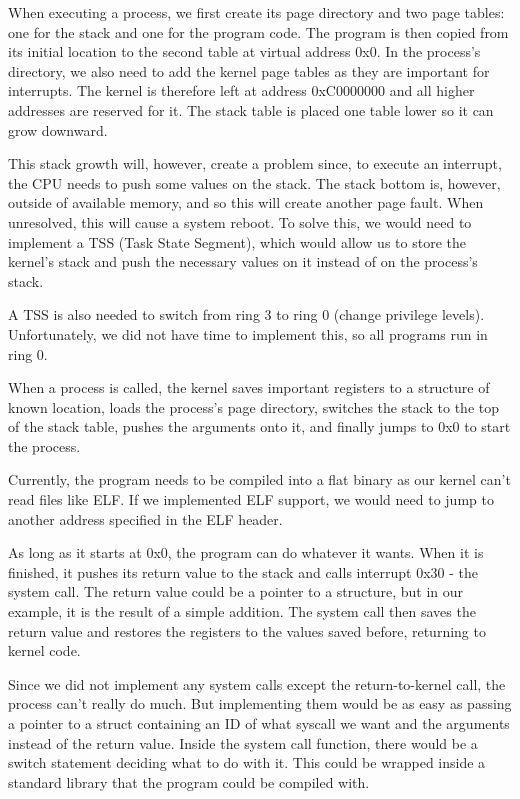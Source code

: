\documentclass{article}
\begin{document}
When executing a process, we first create its page directory and two page tables: one for the stack and one for the program code. The program is then copied from its initial location to the second table at virtual address 0x0. In the process's directory, we also need to add the kernel page tables as they are important for interrupts. The kernel is therefore left at address 0xC0000000 and all higher addresses are reserved for it. The stack table is placed one table lower so it can grow downward. 

This stack growth will, however, create a problem since, to execute an interrupt, the CPU needs to push some values on the stack. The stack bottom is, however, outside of available memory, and so this will create another page fault. When unresolved, this will cause a system reboot. To solve this, we would need to implement a TSS (Task State Segment), which would allow us to store the kernel's stack and push the necessary values on it instead of on the process's stack. 

A TSS is also needed to switch from ring 3 to ring 0 (change privilege levels). Unfortunately, we did not have time to implement this, so all programs run in ring 0.

When a process is called, the kernel saves important registers to a structure of known location, loads the process's page directory, switches the stack to the top of the stack table, pushes the arguments onto it, and finally jumps to 0x0 to start the process. 

Currently, the program needs to be compiled into a flat binary as our kernel can't read files like ELF. If we implemented ELF support, we would need to jump to another address specified in the ELF header.

As long as it starts at 0x0, the program can do whatever it wants. When it is finished, it pushes its return value to the stack and calls interrupt 0x30 - the system call. The return value could be a pointer to a structure, but in our example, it is the result of a simple addition. The system call then saves the return value and restores the registers to the values saved before, returning to kernel code. 

Since we did not implement any system calls except the return-to-kernel call, the process can't really do much. But implementing them would be as easy as passing a pointer to a struct containing an ID of what syscall we want and the arguments instead of the return value. Inside the system call function, there would be a switch statement deciding what to do with it. This could be wrapped inside a standard library that the program could be compiled with.
\end{document}
